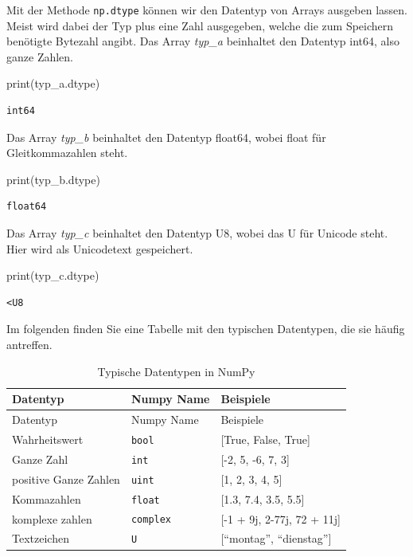 \documentclass[
  letterpaper,
  DIV=11,
  numbers=noendperiod]{scrreprt}
\newenvironment{Shaded}{\begin{snugshade}}{\end{snugshade}}
\newcommand{\BuiltInTok}[1]{\textcolor[rgb]{0.00,0.23,0.31}{#1}}
\newcommand{\NormalTok}[1]{\textcolor[rgb]{0.00,0.23,0.31}{#1}}
\begin{document}
Mit der Methode \texttt{np.dtype} können wir den Datentyp von Arrays
ausgeben lassen. Meist wird dabei der Typ plus eine Zahl ausgegeben,
welche die zum Speichern benötigte Bytezahl angibt. Das Array
\emph{typ\_a} beinhaltet den Datentyp int64, also ganze Zahlen.

\begin{Shaded}
\begin{Highlighting}[]
\BuiltInTok{print}\NormalTok{(typ\_a.dtype)}
\end{Highlighting}
\end{Shaded}

\begin{verbatim}
int64
\end{verbatim}

Das Array \emph{typ\_b} beinhaltet den Datentyp float64, wobei float für
Gleitkommazahlen steht.

\begin{Shaded}
\begin{Highlighting}[]
\BuiltInTok{print}\NormalTok{(typ\_b.dtype)}
\end{Highlighting}
\end{Shaded}

\begin{verbatim}
float64
\end{verbatim}

Das Array \emph{typ\_c} beinhaltet den Datentyp U8, wobei das U für
Unicode steht. Hier wird als Unicodetext gespeichert.

\begin{Shaded}
\begin{Highlighting}[]
\BuiltInTok{print}\NormalTok{(typ\_c.dtype)}
\end{Highlighting}
\end{Shaded}

\begin{verbatim}
<U8
\end{verbatim}

Im folgenden finden Sie eine Tabelle mit den typischen Datentypen, die
sie häufig antreffen.

\begin{longtable}[]{@{}lll@{}}
\caption{Typische Datentypen in
NumPy}\label{tbl-datatypes}\tabularnewline
\toprule\noalign{}
Datentyp & Numpy Name & Beispiele \\
\midrule\noalign{}
\endfirsthead
\toprule\noalign{}
Datentyp & Numpy Name & Beispiele \\
\midrule\noalign{}
\endhead
\bottomrule\noalign{}
\endlastfoot
Wahrheitswert & \texttt{bool} & {[}True, False, True{]} \\
Ganze Zahl & \texttt{int} & {[}-2, 5, -6, 7, 3{]} \\
positive Ganze Zahlen & \texttt{uint} & {[}1, 2, 3, 4, 5{]} \\
Kommazahlen & \texttt{float} & {[}1.3, 7.4, 3.5, 5.5{]} \\
komplexe zahlen & \texttt{complex} & {[}-1 + 9j, 2-77j, 72 + 11j{]} \\
Textzeichen & \texttt{U} & {[}``montag'', ``dienstag''{]} \\
\end{longtable}
\end{document}
